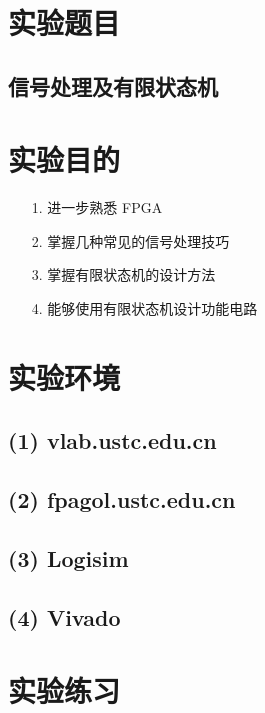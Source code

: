 \documentclass{article}
\begin{document}
    \section{实验题目}
        \subsection*{\qquad  信号处理及有限状态机}
     
    \section{实验目的}
        \begin{enumerate}
            \item [1.]进一步熟悉 FPGA
            \item [2.]掌握几种常见的信号处理技巧
            \item [3.]掌握有限状态机的设计方法
            \item [4.]能够使用有限状态机设计功能电路
        \end{enumerate}
        
    \section{实验环境}
        \subsection*{\qquad (1) vlab.ustc.edu.cn}
        \subsection*{\qquad (2) fpagol.ustc.edu.cn}
        \subsection*{\qquad (3) Logisim}
        \subsection*{\qquad (4) Vivado}
    
    \clearpage
    \section{实验练习}
\end{document}
